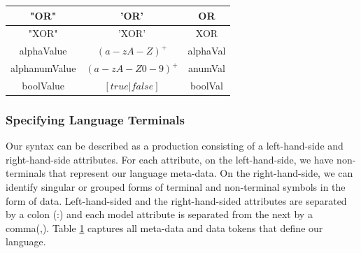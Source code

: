 \documentclass[conference]{IEEEtran}
\begin{document}
\begin{table}[htbp]
\begin{center}
\begin{tabular}{|c|c|c|}
                              "OR" & 'OR' & OR\\ \hline
                              "XOR" & 'XOR' & XOR\\ \hline
                              alphaValue & $(a-zA-Z)^+$ & alphaVal\\ \hline
                              alphanumValue & $(a-zA-Z0-9)^+$ & anumVal\\ \hline
                              boolValue & $[true | false]$ & boolVal\\ \hline
\end{tabular}
\label{tab:langlex}
\end{center}
\end{table}

\subsubsection{Specifying Language Terminals}
Our syntax can be described as a production consisting of a left-hand-side and right-hand-side attributes. For each attribute, on the left-hand-side, we have non-terminals that represent our language meta-data. On the right-hand-side, we can identify singular or grouped forms of terminal and non-terminal symbols in the form of data. Left-hand-sided and the right-hand-sided attributes are separated by a colon (:) and each model attribute is separated from the next by a comma(,). Table \ref{tab:langlex} captures all meta-data and data tokens that define our language.
\end{document}
